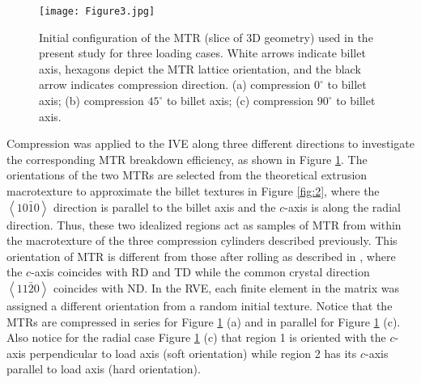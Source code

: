 \documentclass[review]{elsarticle}
\begin{document}
	\begin{figure}[!htb]
	\centering
	\texttt{[image: Figure3.jpg]}
	\caption{\label{fig:2simu}Initial configuration of the MTR (slice of 3D geometry) used in the present study for three loading cases.
      White arrows indicate billet axis, hexagons depict the MTR lattice orientation, and the black arrow indicates compression direction.
      (a) compression $0^{\circ}$ to billet axis; (b) compression $45^{\circ}$ to billet axis; (c) compression $90^{\circ}$ to billet axis.}
	\end{figure}
	
	Compression was applied to the IVE along three different directions to investigate the corresponding MTR breakdown efficiency, as shown in Figure \ref{fig:2simu}.
	The orientations of the two MTRs are selected from the theoretical extrusion macrotexture to approximate the billet textures in Figure \ref{fig:2}, where the $\left< 10\bar{1}0 \right>$ direction is parallel to the billet axis and the $c$-axis is along the radial direction.
	Thus, these two idealized regions act as samples of MTR from within the macrotexture of the three compression cylinders described previously.
	This orientation of MTR is different from those after rolling as described in \cite{r29,r30}, where the $c$-axis coincides with RD and TD while the common crystal direction $\left< 11\bar{2}0 \right>$ coincides with ND.
	In the RVE, each finite element in the matrix was assigned a different orientation from a random initial texture.	
	Notice that the MTRs are compressed in series for Figure \ref{fig:2simu} (a) and in parallel for Figure \ref{fig:2simu} (c).
	Also notice for the radial case Figure \ref{fig:2simu} (c) that region 1 is oriented with the $c$-axis perpendicular to load axis (soft orientation) while region 2 has its $c$-axis parallel to load axis (hard orientation).
\end{document}
